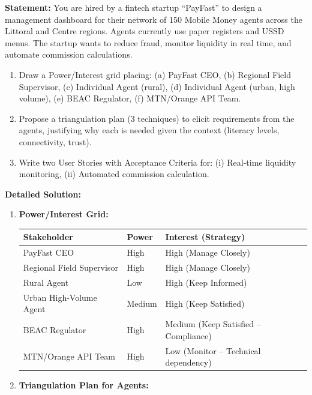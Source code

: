 \documentclass[11pt]{article}
\begin{document}
\begin{exoresolu}
\textbf{Statement:} You are hired by a fintech startup ``PayFast'' to design a management dashboard for their network of 150 Mobile Money agents across the Littoral and Centre regions. Agents currently use paper registers and USSD menus. The startup wants to reduce fraud, monitor liquidity in real time, and automate commission calculations.
\begin{enumerate}
    \item Draw a Power/Interest grid placing: (a) PayFast CEO, (b) Regional Field Supervisor, (c) Individual Agent (rural), (d) Individual Agent (urban, high volume), (e) BEAC Regulator, (f) MTN/Orange API Team.
    \item Propose a triangulation plan (3 techniques) to elicit requirements from the agents, justifying why each is needed given the context (literacy levels, connectivity, trust).
    \item Write two User Stories with Acceptance Criteria for: (i) Real-time liquidity monitoring, (ii) Automated commission calculation.
\end{enumerate}
\tcblower
\textbf{Detailed Solution:}
\begin{enumerate}
    \item \textbf{Power/Interest Grid:}
    \begin{center}
    \begin{tabularx}{\linewidth}{|l|l|X|}\hline
    \rowcolor{popblueL} \textbf{Stakeholder} & \textbf{Power} & \textbf{Interest (Strategy)} \\ \hline
    PayFast CEO & High & High (Manage Closely) \\ \hline
    Regional Field Supervisor & High & High (Manage Closely) \\ \hline
    Rural Agent & Low & High (Keep Informed) \\ \hline
    Urban High-Volume Agent & Medium & High (Keep Satisfied) \\ \hline
    BEAC Regulator & High & Medium (Keep Satisfied -- Compliance) \\ \hline
    MTN/Orange API Team & High & Low (Monitor -- Technical dependency) \\ \hline
    \end{tabularx}
    \end{center}
    \item \textbf{Triangulation Plan for Agents:}
    \begin{enumerate}

\end{enumerate}
\end{enumerate}
\end{exoresolu}
\end{document}
